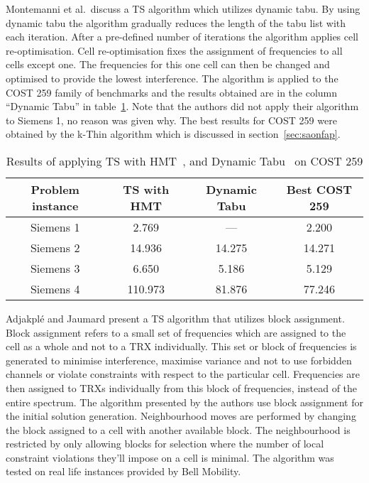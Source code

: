 Montemanni et al.\ discuss a \gls{TS} algorithm which utilizes dynamic tabu\cite{MontiTS}. By using dynamic tabu the algorithm gradually reduces the length of the tabu list with each iteration. After a pre-defined number of iterations the algorithm applies cell re-optimisation. Cell re-optimisation fixes the assignment of frequencies to all cells except one. The frequencies for this one cell can then be changed and optimised to provide the lowest interference\cite{MontiTS}. The algorithm is applied to the COST 259 family of benchmarks and the results obtained are in the column ``Dynamic Tabu'' in table~\ref{TSCOST259}. Note that the authors did not apply their algorithm to Siemens 1, no reason was given why. The best results for \gls{COST} 259 were obtained by the k-Thin algorithm which is discussed in section~\ref{sec:saonfap}.
\begin{table}[H]
\centering
	\begin{tabular}{| c | c | c | c |}
		\hline
        Problem instance & \gls{TS} with HMT & Dynamic Tabu & Best COST 259 \\ \hline
        Siemens 1 & 2.769 & --- & 2.200 \\ \hline
        Siemens 2 & 14.936 & 14.275 & 14.271 \\ \hline
        Siemens 3 & 6.650 & 5.186 & 5.129 \\ \hline
        Siemens 4 & 110.973 & 81.876 & 77.246 \\ \hline
	\end{tabular}
    \caption{Results of applying \gls{TS} with HMT~\cite{TabuMontemanniSmith}, and Dynamic Tabu~\cite{MontiTS} on COST 259}
\label{TSCOST259}
\end{table}

Adjakpl\'{e} and Jaumard present a TS algorithm that utilizes block assignment\cite{AdJa97}. Block assignment refers to a small set of frequencies which are assigned to the cell as a whole and not to a TRX individually. This set or block of frequencies is generated to minimise interference, maximise variance and not to use forbidden channels or violate constraints with respect to the particular cell. Frequencies are then assigned to TRXs individually from this block of frequencies, instead of the entire spectrum. The algorithm presented by the authors use block assignment for the initial solution generation. Neighbourhood moves are performed by changing the block assigned to a cell with another available block. The neighbourhood is restricted by only allowing blocks for selection where the number of local constraint violations they'll impose on a cell is minimal. The algorithm was tested on real life instances provided by Bell Mobility.

